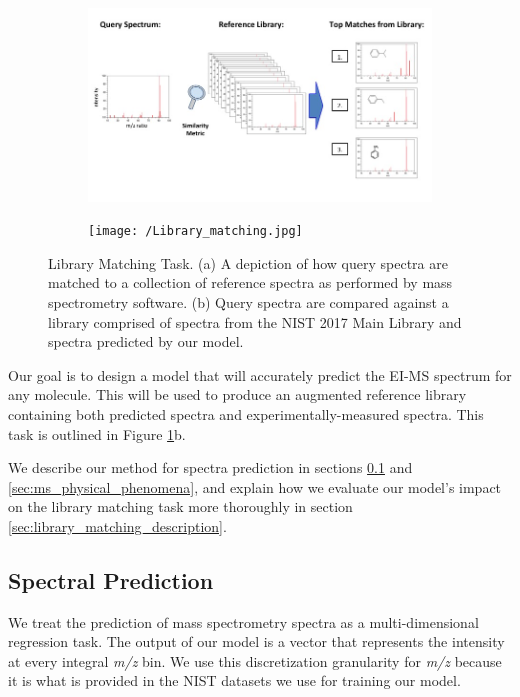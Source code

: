 \begin{figure}[h]
    \centering
    \begin{subfigure}{0.8\textwidth}
        \includegraphics[width=\textwidth, trim={1cm 2.3cm 1cm 0cm}]{baseline_reference_library.jpg}
        \caption{}
    \end{subfigure}
    \begin{subfigure}{0.8\textwidth}
        \texttt{[image: /Library\_matching.jpg]}
        \caption{}
    \end{subfigure}
    \caption{Library Matching Task. (a) A depiction of how query spectra are matched to a collection of reference spectra as performed by mass spectrometry software. (b) Query spectra are compared against a library comprised of spectra from the NIST 2017 Main Library and spectra predicted by our model.}
    \label{fig:library_matching}
\end{figure}

Our goal is to design a model that will accurately predict the EI-MS spectrum for any molecule. This will be used to produce an augmented reference library containing both predicted spectra and experimentally-measured spectra.  This task is outlined in Figure \ref{fig:library_matching}b. 

We describe our method for spectra prediction in sections \ref{sec:ms_spectral_prediction} and \ref{sec:ms_physical_phenomena}, and explain how we evaluate our model's impact on the library matching task more thoroughly in section \ref{sec:library_matching_description}.

\subsection{Spectral Prediction}\label{sec:ms_spectral_prediction}

We treat the prediction of mass spectrometry spectra as a multi-dimensional regression task. The output of our model is a vector that represents the intensity at every integral \textit{m/z} bin. We use this discretization granularity for \textit{m/z} because it is what is provided in the NIST datasets we use for training our model.


